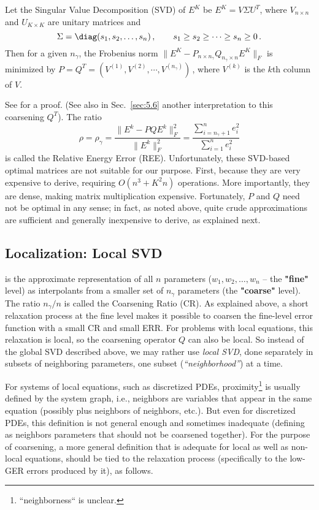 \documentclass{article} %
\begin{document}
\begin{theorem}
Let the Singular Value Decomposition (SVD) of $E^K$ be $E^K = V \Sigma U^T$, where $V_{n \times n}$ and $U_{K \times K}$ are unitary matrices and 
$$
	\Sigma = \diag(s_1, s_2, \dots, s_n)\,,\qquad s_1 \geq s_2 \geq \cdots \geq s_n \geq 0\,.
$$
Then for a given $n_{\gamma}$, the Frobenius norm $\|E^K - P_{n \times n_{\gamma}} Q_{n_{\gamma} \times n} E^K\|_F$ is minimized by $P = Q^T = (V^{(1)}, V^{(2)}, \cdots, V^{(n_{\gamma})})$\,, where $V^{(k)}$ is the $k$th column of $V$.
\end{theorem}

See \cite{eym} for a proof. (See also in Sec.~\ref{sec:5.6} another interpretation to this coarsening $Q^T$). The ratio
\begin{equation}
    \rho = \rho_{\gamma} = \frac{\|E^k - P Q E^k \|^2_F}{\|E^k\|^2_F} =
    \frac{\sum_{i=n_{\gamma}+1}^n e_i^2}{\sum_{i=1}^n e_i^2}
    \label{ree}
\end{equation}
is called the Relative Energy Error (REE). Unfortunately, these SVD-based optimal matrices are not suitable for our purpose. First, because they are very expensive to derive, requiring $O(n^3 + K^2 n)$ operations. More importantly, they are dense, making matrix multiplication expensive. Fortunately, $P$ and $Q$ need not be optimal in any sense; in fact, as noted above, quite crude approximations are sufficient and generally inexpensive to derive, as explained next.

\subsection{Localization: Local SVD}
\label{sec:neighborhoods}
 is the approximate representation of all $n$ parameters ($w_1, w_2, \dots, w_n$ -- the \textbf{"fine"} level) as interpolants from a smaller set of $n_{\gamma}$ parameters (the \textbf{"coarse"} level). The ratio $n_{\gamma}/n$ is called the Coarsening Ratio (CR). As explained above, a short relaxation process at the fine level makes it possible to coarsen the fine-level error function with a small CR and small ERR. For problems with local equations, this relaxation is local, so the coarsening operator $Q$ can also be local. So instead of the global SVD described above, we may rather use {\it local SVD}, done separately in subsets of neighboring parameters, one subset ({\it ``neighborhood''}) at a time.

For systems of local equations, such as discretized PDEs, proximity\footnote{``neighborness`` is unclear.} is usually defined by the system graph, i.e., neighbors are variables that appear in the same equation (possibly plus neighbors of neighbors, etc.). But even for discretized PDEs, this definition is not general enough and sometimes inadequate (defining as neighbors parameters that should not be coarsened together). For the purpose of coarsening, a more general definition that is adequate for local as well as non-local equations, should be tied to the relaxation process (specifically to the low-GER errors produced by it), as follows.
\end{document}
